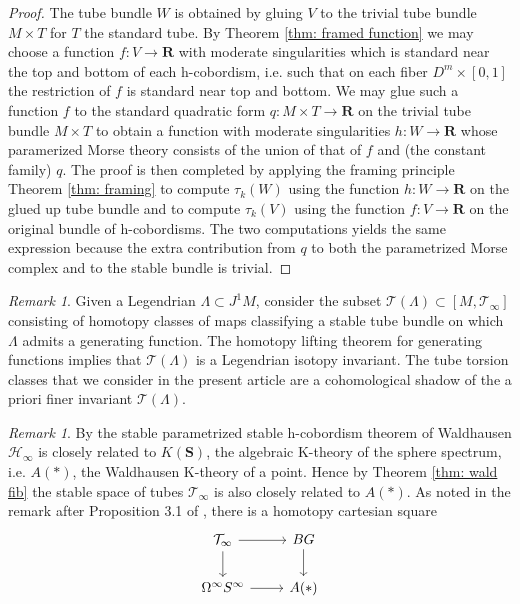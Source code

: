 \documentclass{amsart}
\newcommand\cH{\mathcal{H}}
\newcommand\cT{\mathcal{T}}
\def\bR{\mathbf{R}}
\def\bZ{\mathbf{Z}}
\theoremstyle{definition}
\theoremstyle{remark}
\newtheorem{inductive lemma}[theorem]{Inductive Lemma}
\newtheorem{remark}[theorem]{Remark}
\begin{document}
\begin{proof} The tube bundle $W$ is obtained by gluing $V$ to the trivial tube bundle $M \times T$ for $T$ the standard tube. By Theorem \ref{thm: framed function} we may choose a function $f:V \to \bR$ with moderate singularities which is standard near the top and bottom of each h-cobordism, i.e. such that on each fiber $D^m \times [0,1]$ the restriction of $f$ is standard near top and bottom. We may glue such a function $f$ to the standard quadratic form $q:M \times T \to \bR$ on the trivial tube bundle $M \times T$  to obtain a function with moderate singularities $h:W \to \bR$ whose paramerized Morse theory consists of the union of that of $f$ and (the constant family) $q$. The proof is then completed by applying the framing principle Theorem \ref{thm: framing} to compute $\tau_k(W)$ using the function $h:W \to \bR$ on the glued up tube bundle and to compute $\tau_k(V)$ using the function $f:V \to \bR$ on the original bundle of h-cobordisms. The two computations yields the same expression because the extra contribution from $q$ to both the parametrized Morse complex and to the stable bundle is trivial.   \end{proof}


\begin{remark} Given a Legendrian $\Lambda \subset J^1M$, consider the subset $\cT(\Lambda) \subset [M,\cT_\infty]$ consisting of homotopy classes of maps classifying a stable tube bundle on which $\Lambda$ admits a generating function. The homotopy lifting theorem for generating functions implies that $\cT(\Lambda)$ is a Legendrian isotopy invariant. The tube torsion classes that we consider in the present article are a cohomological shadow of the a priori finer invariant $\cT(\Lambda)$.  \end{remark}%



\begin{remark}
 By the stable parametrized stable h-cobordism theorem of Waldhausen $\cH_\infty$ is closely related to $K(\mathbf{S})$, the algebraic K-theory of the sphere spectrum, i.e. $A(\ast)$, the Waldhausen K-theory of a point. Hence by Theorem \ref{thm: wald fib} the stable space of tubes $\cT_\infty$ is also closely related to $A(\ast)$. As noted in the remark after Proposition 3.1 of \cite{W82}, there is a homotopy cartesian square
$$
\begin{tikzcd} \cT_\infty \ar[r] \ar[d] & BG\ar[d] \\
 \Omega^\infty S^\infty \ar[r]& A( \ast)
\end{tikzcd} $$
\end{remark}
\end{document}
